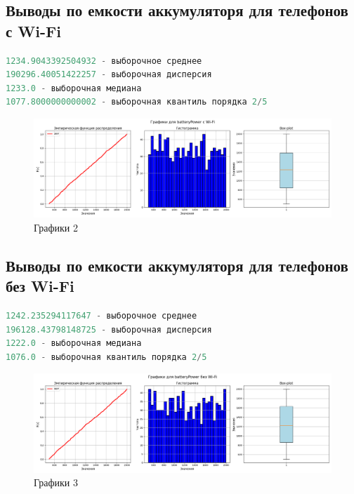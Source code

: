 \documentclass[14pt]{extreport}
\begin{document}
\subsection*{Выводы по емкости аккумуляторя для телефонов с Wi-Fi}

\begin{lstlisting}[language=Python, caption={Вывод 2}]
1234.9043392504932 - выборочное среднее
190296.40051422257 - выборочная дисперсия
1233.0 - выборочная медиана
1077.8000000000002 - выборочная квантиль порядка 2/5
\end{lstlisting}

\begin{figure}[H]
    \centering
    \includegraphics[width=1\linewidth]{Figure_2.png}
    \caption{Графики 2}
\end{figure}

\subsection*{Выводы по емкости аккумуляторя для телефонов без Wi-Fi}

\begin{lstlisting}[language=Python, caption={Вывод 3}]
1242.235294117647 - выборочное среднее
196128.43798148725 - выборочная дисперсия
1222.0 - выборочная медиана
1076.0 - выборочная квантиль порядка 2/5
\end{lstlisting}

\begin{figure}[H]
    \centering
    \includegraphics[width=1\linewidth]{Figure_3.png}
    \caption{Графики 3}
\end{figure}
\end{document}
